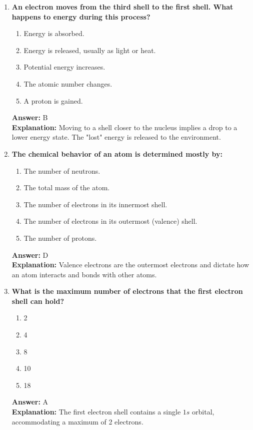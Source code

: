 \documentclass[11pt, a4paper]{article}
\begin{document}
\begin{enumerate}
\item \textbf{An electron moves from the third shell to the first shell. What happens to energy during this process?}
\begin{enumerate}[label=\Alph*.]
    \item Energy is absorbed.
    \item Energy is released, usually as light or heat.
    \item Potential energy increases.
    \item The atomic number changes.
    \item A proton is gained.
\end{enumerate}
\textbf{Answer:} B \\
\textbf{Explanation:} Moving to a shell closer to the nucleus implies a drop to a lower energy state. The "lost" energy is released to the environment.

\item \textbf{The chemical behavior of an atom is determined mostly by:}
\begin{enumerate}[label=\Alph*.]
    \item The number of neutrons.
    \item The total mass of the atom.
    \item The number of electrons in its innermost shell.
    \item The number of electrons in its outermost (valence) shell.
    \item The number of protons.
\end{enumerate}
\textbf{Answer:} D \\
\textbf{Explanation:} Valence electrons are the outermost electrons and dictate how an atom interacts and bonds with other atoms.

\item \textbf{What is the maximum number of electrons that the first electron shell can hold?}
\begin{enumerate}[label=\Alph*.]
    \item 2
    \item 4
    \item 8
    \item 10
    \item 18
\end{enumerate}
\textbf{Answer:} A \\
\textbf{Explanation:} The first electron shell contains a single $1s$ orbital, accommodating a maximum of 2 electrons.


\end{enumerate}
\end{document}
